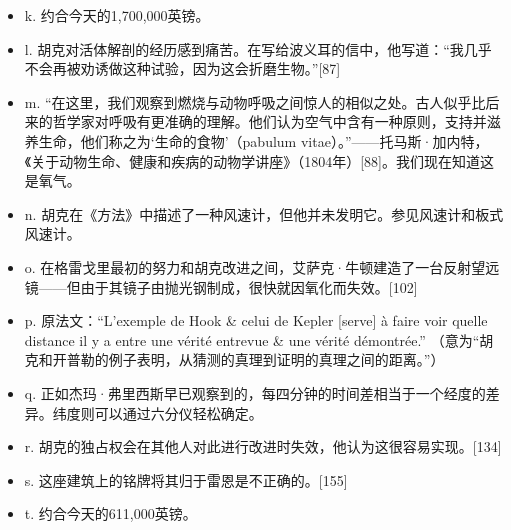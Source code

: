 \begin{itemize}
\item k. 约合今天的1,700,000英镑。
\item l. 胡克对活体解剖的经历感到痛苦。在写给波义耳的信中，他写道：“我几乎不会再被劝诱做这种试验，因为这会折磨生物。”[87]
\item m. “在这里，我们观察到燃烧与动物呼吸之间惊人的相似之处。古人似乎比后来的哲学家对呼吸有更准确的理解。他们认为空气中含有一种原则，支持并滋养生命，他们称之为‘生命的食物’（pabulum vitae）。”——托马斯·加内特，《关于动物生命、健康和疾病的动物学讲座》（1804年）[88]。我们现在知道这是氧气。
\item n. 胡克在《方法》中描述了一种风速计，但他并未发明它。参见风速计和板式风速计。
\item o. 在格雷戈里最初的努力和胡克改进之间，艾萨克·牛顿建造了一台反射望远镜——但由于其镜子由抛光钢制成，很快就因氧化而失效。[102]
\item p. 原法文：“L'exemple de Hook & celui de Kepler [serve] à faire voir quelle distance il y a entre une vérité entrevue & une vérité démontrée.” （意为“胡克和开普勒的例子表明，从猜测的真理到证明的真理之间的距离。”）
\item q. 正如杰玛·弗里西斯早已观察到的，每四分钟的时间差相当于一个经度的差异。纬度则可以通过六分仪轻松确定。
\item r. 胡克的独占权会在其他人对此进行改进时失效，他认为这很容易实现。[134]
\item s. 这座建筑上的铭牌将其归于雷恩是不正确的。[155]
\item t. 约合今天的611,000英镑。
\end{itemize}
